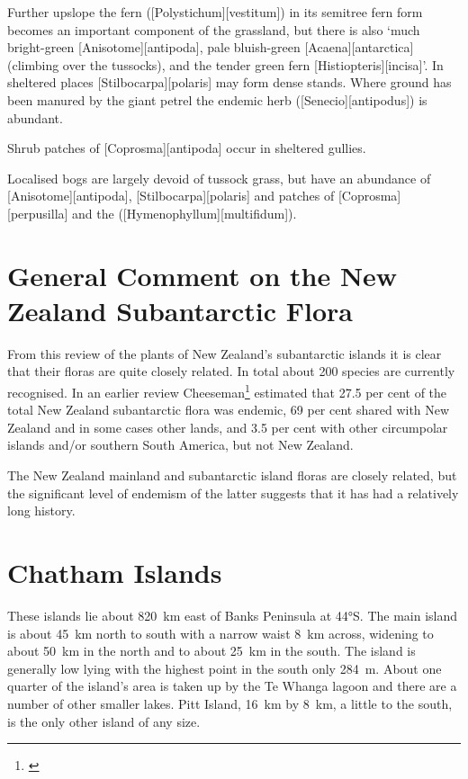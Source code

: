 Further upslope the fern  ([Polystichum][vestitum]) in its semitree fern form becomes an important component of the grassland, but there is also `much bright-green [Anisotome][antipoda], pale bluish-green [Acaena][antarctica] (climbing over the tussocks), and the tender green fern [Histiopteris][incisa]'.
In sheltered places [Stilbocarpa][polaris] may form dense stands.
Where ground has been manured by the giant petrel the endemic herb  ([Senecio][antipodus]) is abundant.

Shrub patches of [Coprosma][antipoda] occur in sheltered gullies.

Localised bogs are largely devoid of tussock grass, but have an abundance of [Anisotome][antipoda], [Stilbocarpa][polaris] and patches of [Coprosma][perpusilla] and the  ([Hymenophyllum][multifidum]).

\section{General Comment on the New Zealand Subantarctic Flora}

From this review of the plants of New Zealand's subantarctic islands it is clear that their floras are quite closely related.
In total about 200 species are currently recognised.
In an earlier review Cheeseman\footnote{\cite{cheeseman1909systematic}} estimated that 27.5 per cent of the total New Zealand subantarctic flora was endemic, 69 per cent shared with New Zealand and in some cases other lands, and 3.5 per cent with other circumpolar islands and/or southern South America, but not New Zealand.

The New Zealand mainland and subantarctic island floras are closely related, but the significant level of endemism of the latter suggests that it has had a relatively long history.

\section{Chatham Islands}

These islands lie about \SI{820}{\kilo\metre} east of Banks Peninsula at \ang{44}S.
The main island is about \SI{45}{\kilo\metre} north to south with a narrow waist \SI{8}{\kilo\metre} across, widening to about \SI{50}{\kilo\metre} in the north and to about \SI{25}{\kilo\metre} in the south.
The island is generally low lying with the highest point in the south only \SI{284}{\metre}.
About one quarter of the island's area is taken up by the Te Whanga lagoon and there are a number of other smaller lakes.
Pitt Island, \SI{16}{\kilo\metre} by \SI{8}{\kilo\metre}, a little to the south, is the only other island of any size.

